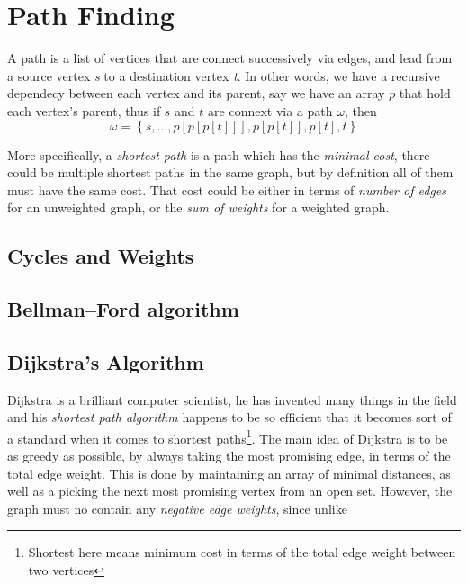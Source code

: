 \documentclass[12pt]{article}
\begin{document}
\section{Path Finding}

A path is a list of vertices that are connect successively via edges, and lead from a source vertex \textit{s} to a destination vertex \textit{t}. In other words, we have a recursive dependecy between each vertex and its parent, say we have an array $p$ that hold each vertex's parent, thus if $s$ and $t$ are connext via a path $\omega$, then \[
  \omega = \left\{s, \ldots, p[p[p[t]]] ,p[p[t]],p[t], t\right\}
\]



More specifically, a \textit{shortest path} is a path which has the \textit{minimal cost}, there could be multiple shortest paths in the same graph, but by definition all of them must have the same cost. That cost could be either in terms of \textit{number of edges} for an unweighted graph, or the \textit{sum of weights} for a weighted graph.

\subsection{Cycles and Weights}

\subsection{Bellman–Ford algorithm}

\subsection{Dijkstra's Algorithm}

Dijkstra is a brilliant computer scientist, he has invented many things in the field and his \textit{shortest path algorithm} happens to be so efficient that it becomes sort of a standard when it comes to shortest paths\footnote{Shortest here means minimum cost in terms of the total edge weight between two vertices}. The main idea of Dijkstra is to be as greedy as possible, by always taking the most promising edge, in terms of the total edge weight. This is done by maintaining an array of minimal distances, as well as a picking the next most promising vertex from an open set. However, the graph must no contain any \textit{negative edge weights}, since unlike
\end{document}
